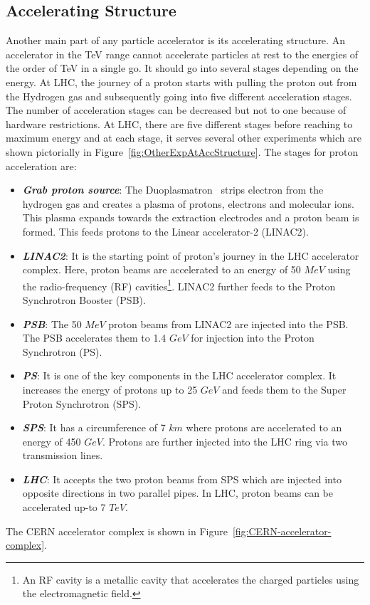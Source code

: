 \subsection{Accelerating Structure} %
\label{sub:accelerating_structure}

Another main part of any particle accelerator is its accelerating structure. An accelerator in the TeV range cannot accelerate particles at rest to the energies of the order of TeV in a single go.  It should go into several stages depending on the energy. At LHC, the journey of a proton starts with pulling the proton out from the Hydrogen gas and subsequently going into five different acceleration stages. The number of acceleration stages can be decreased but not to one because of hardware restrictions. At LHC, there are five different stages before reaching to maximum energy and at each stage, it serves several other experiments which are shown pictorially in Figure~\ref{fig:OtherExpAtAccStructure}. The stages for proton acceleration are:
\begin{itemize}
    \item {\textit {\textbf {Grab proton source}}}: The Duoplasmatron~\cite{LHC-tdr-vol3} strips electron from the hydrogen gas and creates a plasma of protons, electrons and molecular ions. This plasma expands towards the extraction electrodes and a proton beam is formed. This feeds protons to the Linear accelerator-2 (LINAC2).
    \item {\textit {\textbf {LINAC2}}}: It is the starting point of proton's journey in the LHC accelerator complex. Here, proton beams are accelerated to an energy of 50 $MeV$ using the radio-frequency (RF) cavities\footnote{An RF cavity is a metallic cavity that accelerates the charged particles using the electromagnetic field.}. LINAC2 further feeds to the Proton Synchrotron Booster (PSB).
    \item {\textit {\textbf {PSB}}}: The 50 $MeV$ proton beams from LINAC2 are injected into the PSB. The PSB accelerates them to 1.4 $GeV$ for injection into the Proton Synchrotron (PS).
    \item {\textit {\textbf {PS}}}: It is one of the key components in the LHC accelerator complex. It increases the energy of protons up to 25 $GeV$ and feeds them to the Super Proton Synchrotron (SPS).
    \item {\textit {\textbf {SPS}}}: It has a circumference of 7 $km$ where protons are accelerated to an energy of 450 $GeV$. Protons are further injected into the LHC ring via two transmission lines.
    \item {\textit {\textbf {LHC}}}: It accepts the two proton beams from SPS which are injected into opposite directions in two parallel pipes. In LHC, proton beams can be accelerated up-to 7 $TeV$.
\end{itemize}
The CERN accelerator complex is shown in Figure~\ref{fig:CERN-accelerator-complex}.  

